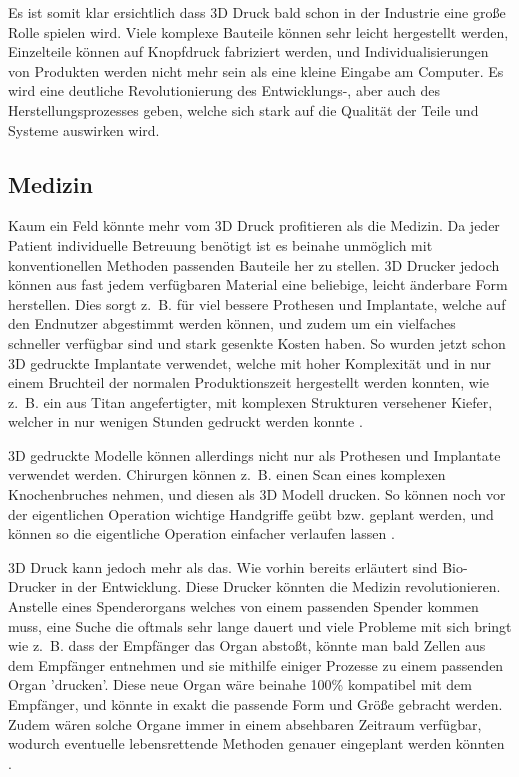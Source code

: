 Es ist somit klar ersichtlich dass 3D Druck bald schon in der Industrie eine große Rolle spielen wird. Viele komplexe Bauteile können sehr leicht hergestellt werden, Einzelteile können auf Knopfdruck fabriziert werden, und Individualisierungen von Produkten werden nicht mehr sein als eine kleine Eingabe am Computer. Es wird eine deutliche Revolutionierung des Entwicklungs-, aber auch des Herstellungsprozesses geben, welche sich stark auf die Qualität der Teile und Systeme auswirken wird.
\subsection{Medizin}

Kaum ein Feld könnte mehr vom 3D Druck profitieren als die Medizin. Da jeder Patient individuelle Betreuung benötigt ist es beinahe unmöglich mit konventionellen Methoden passenden Bauteile her zu stellen. 3D Drucker jedoch können aus fast jedem verfügbaren Material eine beliebige, leicht änderbare Form herstellen. Dies sorgt z.~B. für viel bessere Prothesen und Implantate, welche auf den Endnutzer abgestimmt werden können, und zudem um ein vielfaches schneller verfügbar sind und stark gesenkte Kosten haben. So wurden jetzt schon 3D gedruckte Implantate verwendet, welche mit hoher Komplexität und in nur einem Bruchteil der normalen Produktionszeit hergestellt werden konnten, wie z.~B. ein aus Titan angefertigter, mit komplexen Strukturen versehener Kiefer, welcher in nur wenigen Stunden gedruckt werden konnte \parencite{IRONJAW}.

3D gedruckte Modelle können allerdings nicht nur als Prothesen und Implantate verwendet werden. Chirurgen können z.~B. einen Scan eines komplexen Knochenbruches nehmen, und diesen als 3D Modell drucken. So können noch vor der eigentlichen Operation wichtige Handgriffe geübt bzw. geplant werden, und können so die eigentliche Operation einfacher verlaufen lassen \parencite{ORTHOPEDICS}.

3D Druck kann jedoch mehr als das. Wie vorhin bereits erläutert sind Bio-Drucker in der Entwicklung. Diese Drucker könnten die Medizin revolutionieren. Anstelle eines Spenderorgans welches von einem passenden Spender kommen muss, eine Suche die oftmals sehr lange dauert und viele Probleme mit sich bringt wie z.~B. dass der Empfänger das Organ abstoßt, könnte man bald Zellen aus dem Empfänger entnehmen und sie mithilfe einiger Prozesse zu einem passenden Organ 'drucken'. Diese neue Organ wäre beinahe 100\% kompatibel mit dem Empfänger, und könnte in exakt die passende Form und Größe gebracht werden. Zudem wären solche Organe immer in einem absehbaren Zeitraum verfügbar, wodurch eventuelle lebensrettende Methoden genauer eingeplant werden könnten \parencite{ORGANOVO}.

